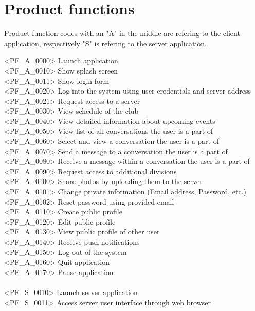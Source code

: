 \chapter{Product functions}
Product function codes with an "A" in the middle are refering to the client application, respectively "S" is refering to the server application. 


<PF\_A\_0000> Launch application \\
<PF\_A\_0010> Show splash screen \\
<PF\_A\_0011> Show login form \\ 
<PF\_A\_0020> Log into the system using user credentials and server address \\
<PF\_A\_0021> Request access to a server \\
<PF\_A\_0030> View schedule of the club \\
<PF\_A\_0040> View detailed information about upcoming events \\
<PF\_A\_0050> View list of all conversations the user is a part of \\
<PF\_A\_0060> Select and view a conversation the user is a part of \\
<PF\_A\_0070> Send a message to a conversation the user is a part of \\
<PF\_A\_0080> Receive a message within a conversation the user is a part of \\
<PF\_A\_0090> Request access to additional divisions \\
<PF\_A\_0100> Share photos by uploading them to the server \\
<PF\_A\_0101> Change private information (Email address, Password, etc.) \\
<PF\_A\_0102> Reset password using provided email \\
<PF\_A\_0110> Create public profile \\
<PF\_A\_0120> Edit public profile \\
<PF\_A\_0130> View public profile of other user \\
<PF\_A\_0140> Receive push notifications \\
<PF\_A\_0150> Log out of the system \\
<PF\_A\_0160> Quit application \\
<PF\_A\_0170> Pause application \\
\\
<PF\_S\_0010> Launch server application \\
<PF\_S\_0011> Access server user interface through web browser \\
